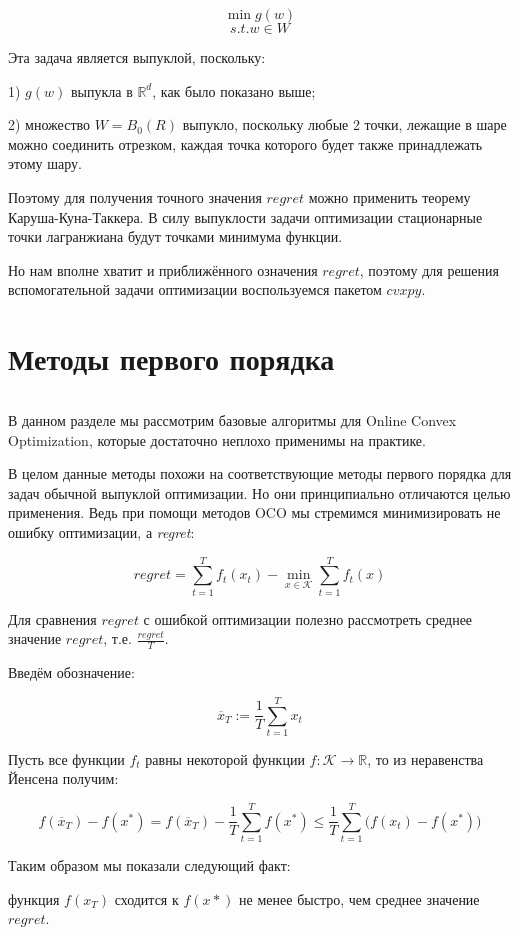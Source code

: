 \documentclass[12pt]{article}
\theoremstyle{definition}
\begin{document}
$$\min g(w)$$
$$s.t. w \in W$$

Эта задача является выпуклой, поскольку:

1) $g(w)$ выпукла в $\mathbb{R}^d$, как было показано выше;

2) множество $W = B_0(R)$ выпукло, поскольку любые 2 точки, лежащие в шаре можно соединить отрезком, каждая точка которого будет также принадлежать этому шару.


Поэтому для получения точного значения $regret$ можно применить теорему Каруша-Куна-Таккера. В силу выпуклости задачи  оптимизации стационарные точки лагранжиана будут точками минимума функции. 

Но нам вполне хватит и приближённого означения $regret$, поэтому для решения вспомогательной задачи оптимизации воспользуемся пакетом $cvxpy$.

\section*{Методы первого порядка}
$ $

В данном разделе мы рассмотрим базовые алгоритмы для Online Convex Optimization, которые достаточно неплохо применимы на практике.

В целом данные методы похожи на соответствующие методы первого порядка для задач обычной выпуклой оптимизации. Но они принципиально отличаются целью применения. Ведь при помощи методов OCO мы стремимся минимизировать не ошибку оптимизации, а \textit{regret}:

$$regret = \sum\limits_{t=1}^T f_t(x_t) - \min\limits_{x \in \mathcal{K}} \sum\limits_{t=1}^T f_t(x)$$

Для сравнения $regret$ с ошибкой оптимизации полезно рассмотреть среднее значение $regret$, т.е. $\frac{regret}{T}$.

Введём обозначение:

$$\overline{x}_T := \frac{1}{T}\sum\limits_{t=1}^T x_t$$

Пусть все функции $f_t$ равны некоторой функции $f : \mathcal{K} \rightarrow \mathbb{R}$, то из неравенства Йенсена получим:

$$f(\overline{x}_T)-f(x^*) = f(\overline{x}_T)- \frac{1}{T} \sum\limits_{t=1}^T f(x^*) \leq \frac{1}{T}\sum\limits_{t=1}^T \big(f(x_t)-   f(x^*)\big	)$$

Таким образом мы показали следующий факт: 

функция $f(x_T)$ сходится к $f(x*)$ не менее быстро, чем среднее значение $regret$.
\end{document}
